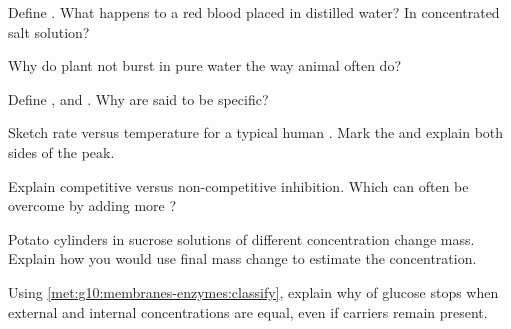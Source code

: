 \begin{exercise}[$\star$]\label{exo:g10:membranes-enzymes:3}
Define . What happens to a red blood  placed in distilled
water? In concentrated salt solution?
\end{exercise}

\begin{exercise}[$\star$]\label{exo:g10:membranes-enzymes:4}
Why do plant  not burst in pure water the way animal  often
do?
\end{exercise}

\begin{exercise}[$\star$]\label{exo:g10:membranes-enzymes:5}
Define ,  and . Why are  said to be
specific?
\end{exercise}

\begin{exercise}[$\star\star$]\label{exo:g10:membranes-enzymes:6}
Sketch rate versus temperature for a typical human . Mark the
 and explain both sides of the peak.
\end{exercise}

\begin{exercise}[$\star\star$]\label{exo:g10:membranes-enzymes:7}
Explain competitive versus non-competitive inhibition. Which can often
be overcome by adding more ?
\end{exercise}

\begin{exercise}[$\star\star$]\label{exo:g10:membranes-enzymes:8}
Potato cylinders in sucrose solutions of different concentration change
mass. Explain how you would use final mass change to estimate the
 concentration.
\end{exercise}

\begin{exercise}[$\star\star$]\label{exo:g10:membranes-enzymes:9}
Using \cref{met:g10:membranes-enzymes:classify}, explain why  of glucose stops when external and internal concentrations
are equal, even if carriers remain present.
\end{exercise}

